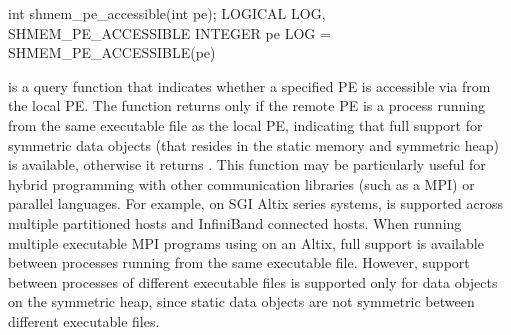 \synC     
int shmem_pe_accessible(int pe); %
\synF
LOGICAL LOG, SHMEM_PE_ACCESSIBLE
INTEGER pe
LOG = SHMEM_PE_ACCESSIBLE(pe) %

{
        is  a  query function  that indicates  whether  a
       specified \ac{PE} is accessible via \openshmem from the local \ac{PE}. The  function returns  only if  the  remote  \ac{PE} is a process  running from the same executable  file as the local \ac{PE}, indicating that full \openshmem support for symmetric data objects (that resides in the static memory and symmetric heap) is available, otherwise it returns .  This function may be particularly useful for hybrid programming with other communication libraries (such as a \ac{MPI}) or parallel languages.  For example, on  SGI Altix  series  systems, \openshmem is  supported  across multiple partitioned hosts and InfiniBand connected hosts. When running multiple executable MPI programs using \openshmem on an Altix, full \openshmem support is available between processes running from the same executable file. However, \openshmem support between processes of different executable  files  is  supported only for data objects on the symmetric heap, since static data objects are  not symmetric  between  different executable  files.        
}
{
}

\eAPI
